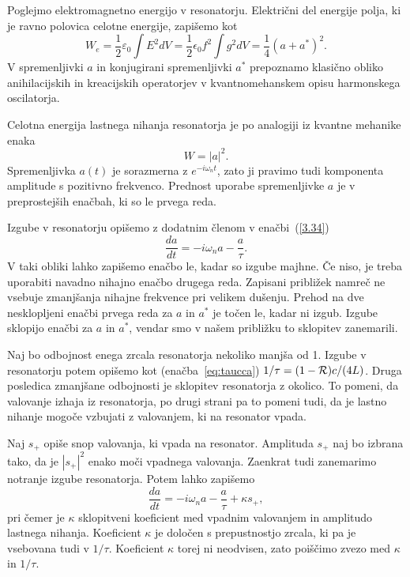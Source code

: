 Poglejmo elektromagnetno energijo v resonatorju. Električni
del energije polja, ki je ravno polovica celotne energije, zapišemo kot
\begin{equation}
W_e = \frac{1}{2}\varepsilon_0 \int E^2 dV = \frac{1}{2}\epsilon_{0}f^{2}
\int g^{2}dV = \frac{1}{4} (a+a^{*})^2.
\end{equation}
V spremenljivki $a$ in konjugirani spremenljivki $a^{*}$ prepoznamo 
klasično obliko anihilacijskih in kreacijskih operatorjev v kvantnomehanskem 
opisu harmonskega oscilatorja. 

Celotna energija lastnega nihanja resonatorja je po analogiji iz kvantne mehanike enaka
\begin{equation}
W=|a|^2.
\label{3.35}
\end{equation}
Spremenljivka $a(t)$ je sorazmerna z $e^{-i\omega_{n}t}$, 
zato ji pravimo tudi komponenta amplitude s pozitivno frekvenco. 
Prednost uporabe spremenljivke $a$ je v preprostejših enačbah, ki so le prvega reda. 

Izgube v resonatorju opišemo z dodatnim členom v enačbi~(\ref{3.34})
\begin{equation}
\frac{da}{dt}=-i\omega_{n}a-\frac{a}{\tau}.
\label{3.36}
\end{equation}
V taki obliki lahko zapišemo enačbo le, kadar so izgube majhne. Če niso, 
je treba uporabiti navadno nihajno enačbo drugega reda. Zapisani približek
namreč ne vsebuje zmanjšanja nihajne frekvence pri velikem dušenju.
Prehod na dve nesklopljeni enačbi prvega reda za $a$ in $a^*$
je točen le, kadar ni izgub. Izgube sklopijo enačbi za $a$ in $a^{\ast}$, 
vendar smo v našem približku to sklopitev zanemarili.

Naj bo odbojnost enega zrcala resonatorja nekoliko manjša od 1. Izgube v resonatorju 
potem opišemo kot (enačba~\ref{eq:taucca}) $1/\tau=(1-{\cal R})c/(4L)$. Druga posledica
zmanjšane odbojnosti je sklopitev resonatorja z okolico. To pomeni, 
da valovanje izhaja iz resonatorja, po drugi strani pa to pomeni tudi, da je 
lastno nihanje mogoče vzbujati z valovanjem, ki na resonator vpada.

Naj $s_{+}$ opiše snop valovanja, ki vpada na resonator. Amplituda $s_{+}$
naj bo izbrana tako, da je $|s_{+}|^{2}$ enako moči vpadnega valovanja. Zaenkrat
tudi zanemarimo notranje izgube resonatorja. Potem lahko
zapišemo 
\begin{equation}
\frac{da}{dt}=-i\omega_{n}a-\frac{a}{\tau}+\kappa s_{+},
\label{3.37}
\end{equation}
pri čemer je $\kappa$ sklopitveni koeficient med vpadnim valovanjem in
amplitudo lastnega nihanja. Koeficient $\kappa$ je določen
s prepustnostjo zrcala, ki pa je vsebovana tudi v $1/\tau$. Koeficient
$\kappa$ torej ni neodvisen, zato poiščimo zvezo med $\kappa$ in $1/\tau$.

